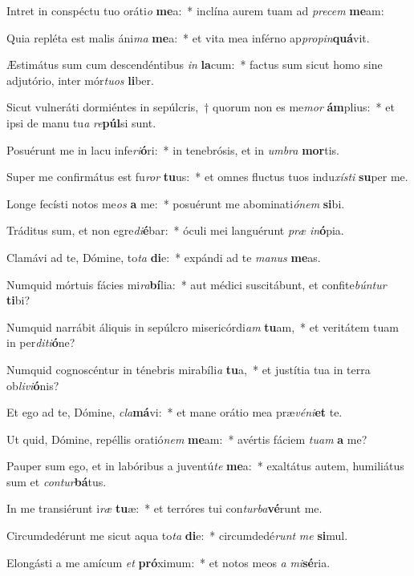 \item Intret in conspéctu tuo oráti\textit{o} \textbf{me}a:~* inclína aurem tuam ad \textit{pre}\textit{cem} \textbf{me}am:
\item Quia repléta est malis áni\textit{ma} \textbf{me}a:~* et vita mea inférno ap\textit{pro}\textit{pin}\textbf{quá}vit.
\item Æstimátus sum cum descendéntibus \textit{in} \textbf{la}cum:~* factus sum sicut homo sine adjutório, inter mór\textit{tu}\textit{os} \textbf{li}ber.
\item Sicut vulneráti dormiéntes in sepúlcris,~† quorum non es me\textit{mor} \textbf{ám}plius:~* et ipsi de manu tu\textit{a} \textit{re}\textbf{púl}si sunt.
\item Posuérunt me in lacu infe\textit{ri}\textbf{ó}ri:~* in tenebrósis, et in \textit{um}\textit{bra} \textbf{mor}tis.
\item Super me confirmátus est fu\textit{ror} \textbf{tu}us:~* et omnes fluctus tuos indu\textit{xís}\textit{ti} \textbf{su}per me.
\item Longe fecísti notos me\textit{os} \textbf{a} me:~* posuérunt me abominati\textit{ó}\textit{nem} \textbf{si}bi.
\item Tráditus sum, et non egre\textit{di}\textbf{é}bar:~* óculi mei languérunt \textit{præ} \textit{in}\textbf{ó}pia.
\item Clamávi ad te, Dómine, to\textit{ta} \textbf{di}e:~* expándi ad te \textit{ma}\textit{nus} \textbf{me}as.
\item Numquid mórtuis fácies mi\textit{ra}\textbf{bí}lia:~* aut médici suscitábunt, et confite\textit{bún}\textit{tur} \textbf{ti}bi?
\item Numquid narrábit áliquis in sepúlcro misericórdi\textit{am} \textbf{tu}am,~* et veritátem tuam in per\textit{di}\textit{ti}\textbf{ó}ne?
\item Numquid cognoscéntur in ténebris mirabíli\textit{a} \textbf{tu}a,~* et justítia tua in terra ob\textit{li}\textit{vi}\textbf{ó}nis?
\item Et ego ad te, Dómine, \textit{cla}\textbf{má}vi:~* et mane orátio mea præ\textit{vé}\textit{ni}\textbf{et} te.
\item Ut quid, Dómine, repéllis oratió\textit{nem} \textbf{me}am:~* avértis fáciem \textit{tu}\textit{am} \textbf{a} me?
\item Pauper sum ego, et in labóribus a juventú\textit{te} \textbf{me}a:~* exaltátus autem, humiliátus sum et \textit{con}\textit{tur}\textbf{bá}tus.
\item In me transiérunt i\textit{ræ} \textbf{tu}æ:~* et terróres tui con\textit{tur}\textit{ba}\textbf{vé}runt me.
\item Circumdedérunt me sicut aqua to\textit{ta} \textbf{di}e:~* circumdedé\textit{runt} \textit{me} \textbf{si}mul.
\item Elongásti a me amícum \textit{et} \textbf{pró}ximum:~* et notos meos \textit{a} \textit{mi}\textbf{sé}ria.
